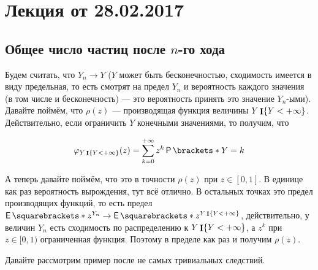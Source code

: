 \section{Лекция от 28.02.2017}

\renewcommand{\labelitemii}{$\bullet$}

\subsection{Общее число частиц после $n$-го хода}

Будем считать, что $Y_n \to Y$ ($Y$ может быть бесконечностью, сходимость
имеется в виду предельная, то есть смотрят на предел $Y_n$ и вероятность каждого значения 
(в том числе и бесконечность) --- это вероятность принять это значение $Y_n$-ыми).
Давайте
поймём, что $\rho(z)$ --- производящая функция величины $Y\mathop{\mathbf{I}}\{Y < +\infty\}$. 
Действительно, если ограничить $Y$ конечными значениями, то получим, что

\[
  \phi_{Y\I\{Y < +\infty\}}(z) = \sum\limits_{k = 0}^{+\infty} z^k \Pr{Y = k}
\]

А теперь давайте поймём, что это в точности $\rho(z)$ при $z \in [0, 1]$.
В единице как раз вероятность вырождения, тут всё отлично. В остальных точках
это предел производящих функций, то есть предел $\E{z^{Y_n}} \to \E{z^{Y \I\{Y < +\infty\}}}$,
действительно, у величин $Y_n$ есть сходимость по распределению
к $Y \mathop{\mathbf{I}}\{Y < +\infty\}$, а $z^k$ при $z \in [0, 1)$ ограниченная функция. Поэтому
в пределе как раз и получим $\rho(z)$.

Давайте рассмотрим пример после не самых тривиальных следствий.

